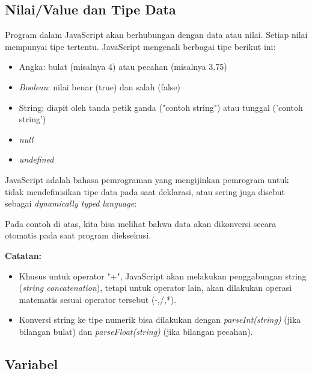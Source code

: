 \subsection{Nilai/Value dan Tipe Data}

Program dalam JavaScript akan berhubungan dengan data atau nilai. Setiap nilai mempunyai tipe tertentu. JavaScript mengenali berbagai tipe berikut ini:
\begin{itemize}
  \item Angka: bulat (misalnya 4) atau pecahan (misalnya 3.75)
  \item \textit{Boolean}: nilai benar (true) dan salah (false)
  \item String: diapit oleh tanda petik ganda ("contoh string") atau tunggal ('contoh string')
  \item \textit{null}
  \item \textit{undefined}
\end{itemize}

JavaScript adalah bahasa pemrograman yang mengijinkan pemrogram untuk tidak mendefinisikan tipe data pada saat deklarasi, atau sering juga disebut sebagai \textit{dynamically typed language}:



Pada contoh di atas, kita bisa melihat bahwa data akan dikonversi secara otomatis pada saat program dieksekusi.

\begin{Sbox}
\begin{minipage}{\textwidth}
\textbf{Catatan:}
\begin{itemize}
  \item Khusus untuk operator "+", JavaScript akan melakukan penggabungan string (\textit{string concatenation}), tetapi untuk operator lain, akan dilakukan operasi matematis sesuai operator tersebut (-,/,*).
  \item Konversi string ke tipe numerik bisa dilakukan dengan \textit{parseInt(string)} (jika bilangan bulat) dan \textit{parseFloat(string)} (jika bilangan pecahan).
\end{itemize}
\end{minipage}
\end{Sbox}
\begin{center}
\shadowbox{\TheSbox}
\end{center}

\subsection{Variabel}

